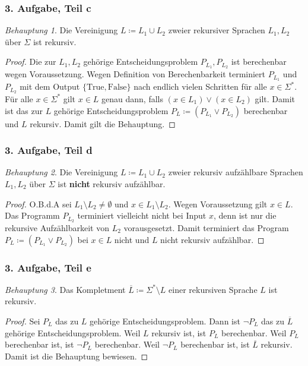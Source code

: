 \documentclass[draft,a4paper]{article}
\theoremstyle{remark}
\newtheorem*{beh}{Behauptung}
\begin{document}
\subsubsection*{3. Aufgabe, Teil c}
\begin{beh}
  Die Vereinigung \(L \coloneq L_{1} \cup L_{2}\) zweier rekursiver Sprachen
  \(L_{1}, L_{2}\) über \(\Sigma\) ist rekursiv.
\end{beh}
\begin{proof}
  Die zur \(L_{1}, L_{2}\) gehörige Entscheidungsproblem
  \(P_{L_{1}}, P_{L_{2}}\) ist berechenbar wegen Voraussetzung.  Wegen
  Definition von Berechenbarkeit terminiert \(P_{L_{1}}\) und
  \(P_{L_{2}}\) mit dem Output \(\{\text{True}, \text{False}\}\) nach
  endlich vielen Schritten für alle \(x \in \Sigma^{*}\).  Für alle
  \(x \in \Sigma^{*}\) gilt \(x \in L\) genau dann, falls
  \((x \in L_{1}) \lor (x \in L_{2})\) gilt.  Damit ist das zur \(L\)
  gehörige Entscheidungsproblem \(P_{L} \coloneq (P_{L_{1}} \lor P_{L_{2}})\)
  berechenbar und \(L\) rekursiv.  Damit gilt die Behauptung.
\end{proof}
\subsubsection*{3. Aufgabe, Teil d}
\begin{beh}
  Die Vereinigung \(L \coloneq L_{1} \cup L_{2}\) zweier rekursiv aufzählbare Sprachen
  \(L_{1}, L_{2}\) über \(\Sigma\) ist \textbf{nicht} rekursiv aufzählbar.
\end{beh}
\begin{proof}
  O.B.d.A sei \(L_{1} \setminus L_{2} \ne \emptyset\) und
  \(x \in L_{1} \setminus L_{2}\).  Wegen Voraussetzung gilt
  \(x \in L\). Das Programm \(P_{L_{2}}\) terminiert vielleicht nicht
  bei Input \(x\), denn ist nur die rekursive Aufzählbarkeit von
  \(L_{2}\) vorausgesetzt.  Damit terminiert das Program
  \(P_{L} \coloneq (P_{L_{1}} \lor P_{L_{2}})\) bei \(x \in L\) nicht und
  \(L\) nicht rekursiv aufzählbar.
\end{proof}
\subsubsection*{3. Aufgabe, Teil e}
\begin{beh}
Das Kompletment \(\overline{L} \coloneq \Sigma^{*} \setminus L\) einer rekursiven Sprache
\(L\) ist rekursiv.
\end{beh}
\begin{proof}
  Sei \(P_{L}\) das zu \(L\) gehörige Entscheidungsproblem.  Dann ist
  \(\neg P_{L}\) das zu \(\overline{L} \) gehörige Entscheidungsproblem.
  Weil \(L\) rekursiv ist, ist \(P_{L}\) berechenbar.  Weil \(P_{L}\)
  berechenbar ist, ist \(\neg P_{L}\) berechenbar.  Weil
  \(\neg P_{L}\) berechenbar ist, ist \(\overline{L} \) rekursiv.  Damit
  ist die Behauptung bewiesen.
\end{proof}
\end{document}
